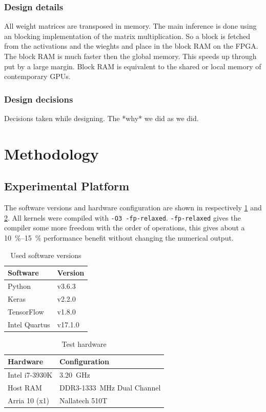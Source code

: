 \documentclass[techrep,english]{ipsj} %
\begin{document}
\subsubsection{Design details}
All weight matrices are transposed in memory.
The main inference is done using an blocking implementation of the matrix multiplication.
So a block is fetched from the activations and the wieghts and place in the block RAM on the FPGA.
The block RAM is much faster then the global memory.
This speeds up through put by a large margin.
Block RAM is equivalent to the shared or local memory of contemporary GPUs.

\subsubsection{Design decisions}
Decisions taken while designing.
The *why* we did as we did.

\section{Methodology}\label{sec:method}
\subsection{Experimental Platform}
The software versions and hardware configuration are shown in respectively \cref{tab:software-versions} and \cref{tab:test-hardware}.
All kernels were compiled with \texttt{-O3 -fp-relaxed}.
\texttt{-fp-relaxed} gives the compiler some more freedom with the order of operations, this gives about a \SIrange{10}{15}{\percent} performance benefit without changing the numerical output.
\begin{table}[h]
  \centering
  \caption{Used software versions}\label{tab:software-versions}
  \begin{tabular}{ll}
    \toprule
    \textbf{Software} & \textbf{Version} \\
    \midrule
    Python & v3.6.3 \\
    Keras & v2.2.0 \\
    TensorFlow & v1.8.0 \\
    Intel Quartus & v17.1.0 \\
    \bottomrule
  \end{tabular}
\end{table}
\begin{table}[h]
  \centering
  \caption{Test hardware}\label{tab:test-hardware}
  \begin{tabular}{ll}
    \toprule
    \textbf{Hardware} & \textbf{Configuration} \\
    \midrule
    Intel i7-3930K & \SI{3.20}{\giga\hertz} \\
    Host RAM & DDR3-\SI{1333}{\mega\hertz} Dual Channel \\
    Arria 10 (x1) & Nallatech 510T \\
    \bottomrule
  \end{tabular}
\end{table}
\end{document}

